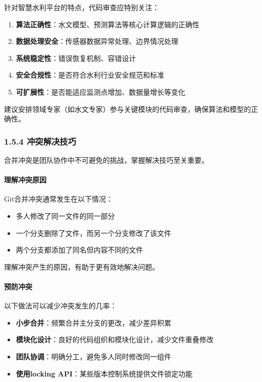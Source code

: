 针对智慧水利平台的特点，代码审查应特别关注：

\begin{enumerate}
\def\labelenumi{\arabic{enumi}.}
\tightlist
\item
  \textbf{算法正确性}：水文模型、预测算法等核心计算逻辑的正确性
\item
  \textbf{数据处理安全}：传感器数据异常处理、边界情况处理
\item
  \textbf{系统稳定性}：错误恢复机制、容错设计
\item
  \textbf{安全合规性}：是否符合水利行业安全规范和标准
\item
  \textbf{可扩展性}：是否能适应监测点增加、数据量增长等变化
\end{enumerate}

建议安排领域专家（如水文专家）参与关键模块的代码审查，确保算法和模型的正确性。

\subsubsection{1.5.4
冲突解决技巧}\label{ux51b2ux7a81ux89e3ux51b3ux6280ux5de7}

合并冲突是团队协作中不可避免的挑战，掌握解决技巧至关重要。

\paragraph{理解冲突原因}\label{ux7406ux89e3ux51b2ux7a81ux539fux56e0}

Git合并冲突通常发生在以下情况：

\begin{itemize}
\tightlist
\item
  多人修改了同一文件的同一部分
\item
  一个分支删除了文件，而另一个分支修改了该文件
\item
  两个分支都添加了同名但内容不同的文件
\end{itemize}

理解冲突产生的原因，有助于更有效地解决问题。

\paragraph{预防冲突}\label{ux9884ux9632ux51b2ux7a81}

以下做法可以减少冲突发生的几率：

\begin{itemize}
\tightlist
\item
  \textbf{小步合并}：频繁合并主分支的更改，减少差异积累
\item
  \textbf{模块化设计}：良好的代码组织和模块化设计，减少文件重叠修改
\item
  \textbf{团队协调}：明确分工，避免多人同时修改同一组件
\item
  \textbf{使用locking API}：某些版本控制系统提供文件锁定功能
\end{itemize}

